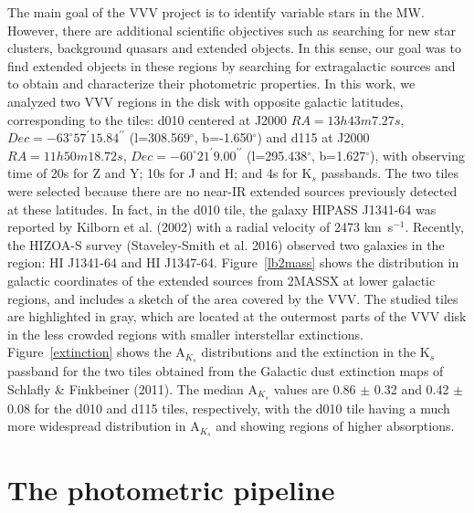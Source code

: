 \documentclass[preprint2]{aastex}
\begin{document}
The main goal of the VVV project is to identify variable stars in the MW.
However, there are additional scientific objectives such as searching for 
new star clusters, background quasars and extended objects. In this sense,
our goal was to find extended objects in these regions by searching for
extragalactic sources 
and to obtain and characterize 
their photometric 
properties. In this work, we analyzed two VVV regions in the
disk with opposite galactic latitudes, corresponding to the tiles: d010 centered at 
J2000 $RA=13h43m7.27s$, 
$Dec=-63^{\circ}57^{\prime}15.84^{\prime\prime}$ (l=308.569$^{\circ}$, 
b=-1.650$^{\circ}$) and d115 at J2000 
$RA=11h50m18.72s$, $Dec=-60^{\circ}21^{\prime}9.00^{\prime\prime}$ 
(l=295.438$^{\circ}$,
b=1.627$^{\circ}$), with observing time of 20s for Z and Y; 
10s for J and H; and 4s for K$_s$ passbands.  The two tiles were selected because there are no
near-IR extended sources previously
detected at these latitudes.  In fact,  in the d010 tile, the galaxy
HIPASS J1341-64 was
reported by Kilborn
et al. (2002)  with a radial velocity of
2473 km~s$^{-1}$.  Recently, the HIZOA-S survey (Staveley-Smith et al.
2016) observed two galaxies in the region: HI J1341-64 and HI J1347-64. 
Figure~\ref{lb2mass} shows the distribution in
galactic coordinates of the extended sources from 2MASSX at lower
galactic regions, and includes a sketch of the area covered
by the VVV. The studied tiles are highlighted in gray, which are located
at the outermost parts of the VVV disk in the less
crowded regions with smaller interstellar extinctions. 
  Figure~\ref{extinction}
  shows the A$_{K_s}$ distributions and the extinction in the K$_s$ passband for
  the two tiles
obtained from the
Galactic dust extinction maps of Schlafly \& Finkbeiner (2011). 
The median A$_{K_s}$  values are 0.86 $\pm$ 0.32 and 0.42 $\pm$ 0.08
for the d010 and d115 tiles, respectively, with the d010 tile having
a much more 
widespread 
distribution in A$_{K_s}$ and showing regions of higher absorptions. 



\section{The photometric pipeline}
\end{document}
